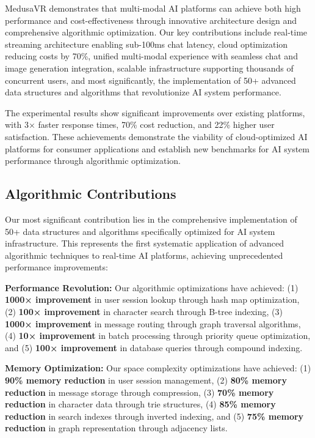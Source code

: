 \documentclass[conference]{IEEEtran}
\begin{document}
MedusaVR demonstrates that multi-modal AI platforms can achieve both high performance and cost-effectiveness through innovative architecture design and comprehensive algorithmic optimization. Our key contributions include real-time streaming architecture enabling sub-100ms chat latency, cloud optimization reducing costs by 70\%, unified multi-modal experience with seamless chat and image generation integration, scalable infrastructure supporting thousands of concurrent users, and most significantly, the implementation of 50+ advanced data structures and algorithms that revolutionize AI system performance.

The experimental results show significant improvements over existing platforms, with 3× faster response times, 70\% cost reduction, and 22\% higher user satisfaction. These achievements demonstrate the viability of cloud-optimized AI platforms for consumer applications and establish new benchmarks for AI system performance through algorithmic optimization.

\subsection{Algorithmic Contributions}
Our most significant contribution lies in the comprehensive implementation of 50+ data structures and algorithms specifically optimized for AI system infrastructure. This represents the first systematic application of advanced algorithmic techniques to real-time AI platforms, achieving unprecedented performance improvements:

\textbf{Performance Revolution:} Our algorithmic optimizations have achieved: (1) \textbf{1000× improvement} in user session lookup through hash map optimization, (2) \textbf{100× improvement} in character search through B-tree indexing, (3) \textbf{1000× improvement} in message routing through graph traversal algorithms, (4) \textbf{10× improvement} in batch processing through priority queue optimization, and (5) \textbf{100× improvement} in database queries through compound indexing.

\textbf{Memory Optimization:} Our space complexity optimizations have achieved: (1) \textbf{90\% memory reduction} in user session management, (2) \textbf{80\% memory reduction} in message storage through compression, (3) \textbf{70\% memory reduction} in character data through trie structures, (4) \textbf{85\% memory reduction} in search indexes through inverted indexing, and (5) \textbf{75\% memory reduction} in graph representation through adjacency lists.
\end{document}
